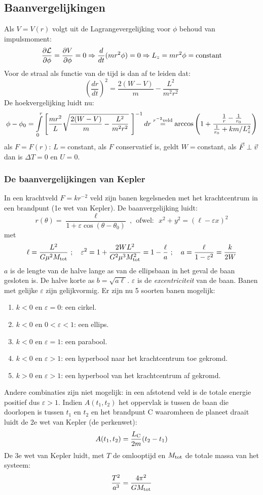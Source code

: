 \documentclass[twoside]{report}
\begin{document}
\subsection{Baanvergelijkingen}
Als $V=V(r)$ volgt uit de Lagrangevergelijking voor $\phi$ behoud van
impulsmoment:
\[
\frac{\partial {\cal L}}{\partial \phi}=\frac{\partial V}{\partial \phi}=0\Rightarrow\frac{d}{dt}(mr^2\phi)=0\Rightarrow L_z=mr^2\phi=\mbox{constant}
\]
Voor de straal als functie van de tijd is dan af te leiden dat:
\[
\left(\frac{dr}{dt}\right)^2=\frac{2(W-V)}{m}-\frac{L^2}{m^2r^2}
\]
De hoekvergelijking luidt nu:
\[
\phi-\phi_0=\int\limits_0^r\left[\frac{mr^2}{L}\sqrt{\frac{2(W-V)}{m}-\frac{L^2}{m^2r^2}}~\right]^{-1}dr
\stackrel{r^{-2}{\rm veld}}{=}
\arccos\left(1+\frac{\frac{1}{r}-\frac{1}{r_0}}{\frac{1}{r_0}+km/L_z^2}\right)
\]
als $F=F(r)$: $L=$constant, als $F$ conservatief is, geldt $W=$constant, als
$\vec{F}\perp\vec{v}$ dan is $\Delta T=0$ en $U=0$.

\subsubsection{De baanvergelijkingen van Kepler}
In een krachtveld $F=kr^{-2}$ veld zijn banen kegelsneden met het
krachtcentrum in een brandpunt (1e wet van Kepler). De baanvergelijking luidt:
\[
r(\theta)=\frac{\ell}{1+\varepsilon\cos(\theta-\theta_0)}~,~~\mbox{ofwel:~~}
x^2+y^2=(\ell-\varepsilon x)^2
\]
met
\[
\ell=\frac{L^2}{G\mu^2M_{\rm tot}}~;~~~\varepsilon^2=1+\frac{2WL^2}{G^2\mu^3M^2_{\rm tot}}=1-\frac{\ell}{a}
~;~~~a=\frac{\ell}{1-\varepsilon^2}=\frac{k}{2W}
\]
$a$ is de lengte van de halve lange as van de ellipsbaan in het geval de baan
gesloten is. De halve korte as $b=\sqrt{a\ell}$. $\varepsilon$ is de
{\it excentriciteit} van de baan. Banen met gelijke $\varepsilon$ zijn
gelijkvormig. Er zijn nu 5 soorten banen mogelijk:
\begin{enumerate}
\item $k<0$ en $\varepsilon=0$: een cirkel.
\item $k<0$ en $0<\varepsilon<1$: een ellips.
\item $k<0$ en $\varepsilon=1$: een parabool.
\item $k<0$ en $\varepsilon>1$: een hyperbool naar het krachtcentrum toe gekromd.
\item $k>0$ en $\varepsilon>1$: een hyperbool van het krachtcentrum af gekromd.
\end{enumerate}
Andere combinaties zijn niet mogelijk: in een afstotend veld is de totale
energie positief dus $\varepsilon>1$.
\npar
Indien $A(t_1,t_2)$ het oppervlak is tussen de baan die doorlopen is tussen
$t_1$ en $t_2$ en het brandpunt C waaromheen de planeet draait luidt de 2e
wet van Kepler (de perkenwet):
\[
A(t_1,t_2)=\frac{L_{\rm C}}{2m}(t_2-t_1)
\]
De 3e wet van Kepler luidt, met $T$ de omlooptijd en $M_{\rm tot}$ de totale
massa van het systeem:
\[
\frac{T^2}{a^3}=\frac{4\pi^2}{GM_{\rm tot}}
\]
\end{document}
